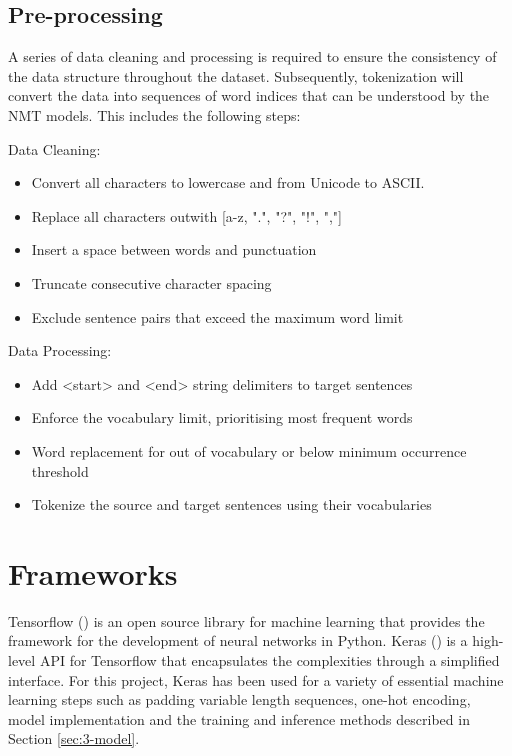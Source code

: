 

\subsection{Pre-processing}

A series of data cleaning and processing is required to ensure the consistency of the data structure throughout the dataset. Subsequently, tokenization will convert the data into sequences of word indices that can be understood by the \acrshort{NMT} models. This includes the following steps:

Data Cleaning:
\begin{itemize}
    \item Convert all characters to lowercase and from Unicode to ASCII. %
    \item Replace all characters outwith [a-z, ".", "?", "!", ","]
    \item Insert a space between words and punctuation
    \item Truncate consecutive character spacing
    \item Exclude sentence pairs that exceed the maximum word limit
\end{itemize}

Data Processing:
\begin{itemize}
    \item Add <start> and <end> string delimiters to target sentences
    \item Enforce the vocabulary limit, prioritising most frequent words
    \item Word replacement for out of vocabulary or below minimum occurrence threshold
    \item Tokenize the source and target sentences using their vocabularies
\end{itemize}

\section{Frameworks}
\label{sec:3-frameworks}

Tensorflow (\cite{tensorflow_2015}) is an open source library for machine learning that provides the framework for the development of neural networks in Python.
Keras (\cite{keras_2015}) is a high-level API for Tensorflow that encapsulates the complexities through a simplified interface.
For this project, Keras has been used for a variety of essential machine learning steps such as padding variable length sequences, one-hot encoding, model implementation and the training and inference methods described in Section \ref{sec:3-model}.

